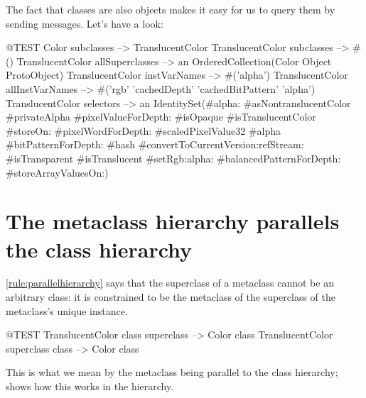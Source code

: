 \documentclass[a4paper,10pt,twoside]{book}
\begin{document}
The fact that classes are also objects makes it easy for us to query them by sending messages. Let's have a look:

\begin{code}{@TEST}
Color subclasses                           --> {TranslucentColor}
TranslucentColor subclasses         --> #()
TranslucentColor allSuperclasses  --> an OrderedCollection(Color Object ProtoObject)
TranslucentColor instVarNames     --> #('alpha')
TranslucentColor allInstVarNames --> #('rgb' 'cachedDepth' 'cachedBitPattern' 'alpha')
TranslucentColor selectors             --> an IdentitySet(#alpha: #asNontranslucentColor #privateAlpha #pixelValueForDepth: #isOpaque #isTranslucentColor #storeOn: #pixelWordForDepth: #scaledPixelValue32 #alpha #bitPatternForDepth: #hash #convertToCurrentVersion:refStream: #isTransparent #isTranslucent #setRgb:alpha: #balancedPatternForDepth: #storeArrayValuesOn:)
\end{code}

\section{The metaclass hierarchy parallels the class hierarchy}

\ref{rule:parallelhierarchy} says that the superclass of a metaclass cannot be an arbitrary class: it is constrained to be the metaclass of the superclass of the metaclass's unique instance.

\begin{code}{@TEST}
TranslucentColor class superclass --> Color class
TranslucentColor superclass class --> Color class
\end{code}

\noindent
This is what we mean by the metaclass  being parallel to the class hierarchy;   shows how this works in the  hierarchy.
\end{document}

